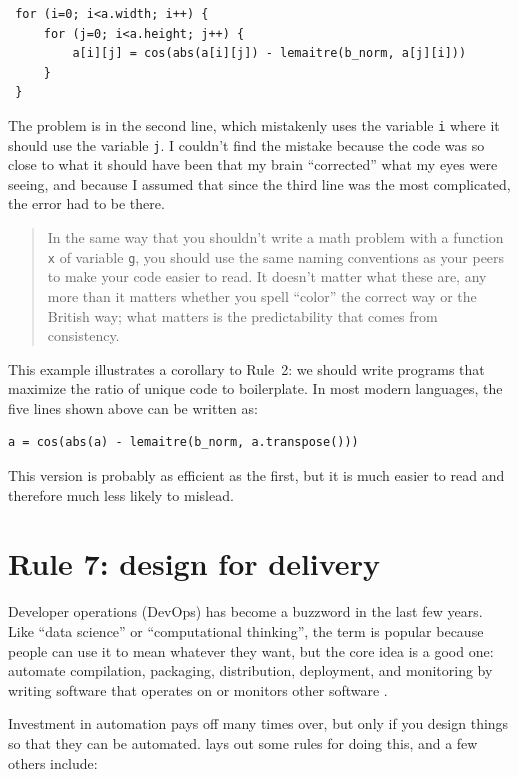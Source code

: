 \documentclass[10pt,letterpaper]{article}
\begin{document}
\begin{lstlisting}
 for (i=0; i<a.width; i++) {
     for (j=0; i<a.height; j++) {
         a[i][j] = cos(abs(a[i][j]) - lemaitre(b_norm, a[j][i]))
     }
 }
\end{lstlisting}

The problem is in the second line,
which mistakenly uses the variable \texttt{i} where it should use the variable \texttt{j}.
I couldn't find the mistake because
the code was so close to what it should have been that my brain ``corrected'' what my eyes were seeing,
and because I assumed that since the third line was the most complicated,
the error had to be there.

\begin{quotation}
  In the same way that you shouldn't write a math problem with a function \texttt{x} of variable \texttt{g},
  you should use the same naming conventions as your peers
  to make your code easier to read.
  It doesn't matter what these are,
  any more than it matters whether you spell ``color'' the correct way or the British way;
  what matters is the predictability that comes from consistency.
\end{quotation}

This example illustrates a corollary to Rule~2:
we should write programs that maximize the ratio of unique code to boilerplate.
In most modern languages,
the five lines shown above can be written as:

\begin{lstlisting}
a = cos(abs(a) - lemaitre(b_norm, a.transpose()))
\end{lstlisting}

\noindent
This version is probably as efficient as the first,
but it is much easier to read and therefore much less likely to mislead.

\section*{Rule 7: design for delivery}

Developer operations (DevOps) has become a buzzword in the last few years.
Like ``data science'' or ``computational thinking'',
the term is popular because people can use it to mean whatever they want,
but the core idea is a good one:
automate compilation, packaging, distribution, deployment, and monitoring
by writing software that operates on or monitors other software \cite{Kim2016,Forsgren2018}.

Investment in automation pays off many times over,
but only if you design things so that they can be automated.
\cite{Taschuk2017} lays out some rules for doing this,
and a few others include:
\end{document}
